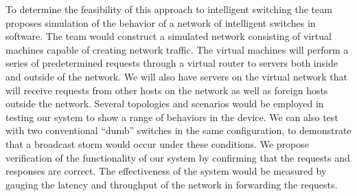     To determine the feasibility of this approach to intelligent switching the team proposes simulation of the behavior of a network of intelligent switches in software.
    The team would construct a simulated network consisting of virtual machines capable of creating network traffic.
    The virtual machines will perform a series of predetermined requests through a virtual router to servers both inside and outside of the network.
    We will also have servers on the virtual network that will receive requests from other hosts on the network as well as foreign hosts outside the network.
    Several topologies and scenarios would be employed in testing our system to show a range of behaviors in the device.
    We can also test with two conventional ``dumb'' switches in the same configuration, to demonstrate that a broadcast storm would occur under these conditions.
    We propose verification of the functionality of our system by confirming that the requests and responses are correct.
    The effectiveness of the system would be measured by gauging the latency and throughput of the network in forwarding the requests.
